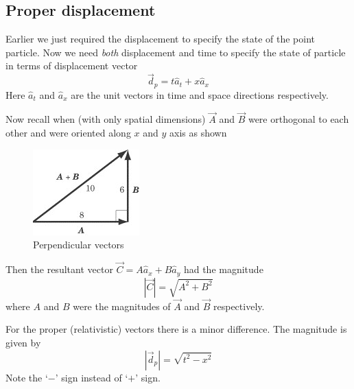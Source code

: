 \documentclass[10pt]{article}
\begin{document}
\subsection{Proper displacement}
Earlier we just required the displacement to specify the state of the point particle.  Now we need \emph{both} displacement and time to specify the state of particle in terms of displacement vector
\begin{equation}
\label{dispvec}
  \vec{d}_p=t\hat{a}_t+x\hat{a}_x
\end{equation}
Here $\hat{a}_t$ and $\hat{a}_x$ are the unit vectors in time and space directions respectively.

Now recall when (with only spatial dimensions) $\vec{A}$ and $\vec{B}$ were orthogonal to each other and were oriented along $x$ and $y$ axis as shown
\begin{figure}[h]
\includegraphics[scale=.5]{perp_vec}
\centering
\caption{Perpendicular vectors}
\centering
\end{figure}

Then the resultant vector $\vec{C}=A\hat{a}_x+B\hat{a}_y$ had the magnitude 
\begin{equation}
  |\vec{C}|=\sqrt{A^2+B^2}
\end{equation}  
where $A$ and $B$ were the magnitudes of $\vec{A}$ and $\vec{B}$ respectively.

For the proper (relativistic) vectors there is a minor difference.  The magnitude is given by 
\begin{equation}
  |\vec{d}_p|=\sqrt{t^2-x^2}
\end{equation}
Note the `$-$' sign instead of `$+$' sign.
\end{document}

